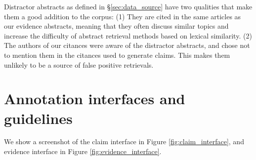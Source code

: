 Distractor abstracts as defined in \S\ref{sec:data_source} have two qualities that make them a good addition to the \ours corpus: (1) They are cited in the same articles as our evidence abstracts, meaning that they often discuss similar topics and increase the difficulty of abstract retrieval methods based on lexical similarity. (2) The authors of our citances were aware of the distractor abstracts, and chose not to mention them in the citances used to generate claims. This makes them unlikely to be a source of false positive retrievals.



\section{Annotation interfaces and guidelines} \label{sec:annotation_interfaces}

We show a screenshot of the claim interface in Figure \ref{fig:claim_interface}, and evidence interface in Figure \ref{fig:evidence_interface}.




